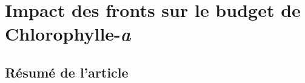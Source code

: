 
\chapter{Impact des fronts sur le budget de Chlorophylle-\textit{a}}
\addChpLof
\label{chp:res-chl}
\graphicspath{{resources/res_chl}}

\minitoc%


\section{Résumé de l'article}
\label{sec:resume-article}


